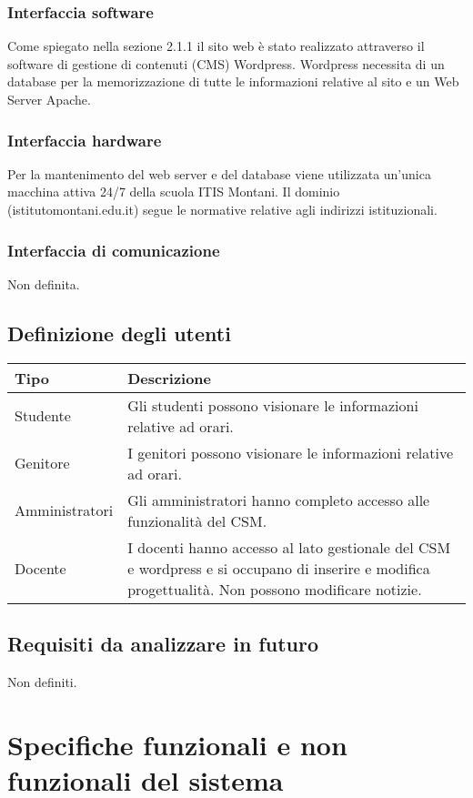 \documentclass{article}
\begin{document}
	\subsubsection{\textbf{Interfaccia software}}
	Come spiegato nella sezione 2.1.1 il sito web è stato realizzato attraverso il software di gestione di contenuti (CMS) Wordpress. Wordpress necessita di un database per la memorizzazione di tutte le informazioni relative al sito e un Web Server Apache.  
	
	\subsubsection{\textbf{Interfaccia hardware}}
	Per la mantenimento del web server e del database viene utilizzata un'unica macchina attiva 24/7 della scuola ITIS Montani. Il dominio (istitutomontani.edu.it) segue le normative relative agli indirizzi istituzionali.
	
	\subsubsection{\textbf{Interfaccia di comunicazione}}
	Non definita.	

	\subsection{\textbf{Definizione degli utenti}}
\begin{tabular}{ |p{3cm}|p{8cm}|  }
	\hline
	\textbf{Tipo}& \textbf{Descrizione}\\
	\hline
	Studente   & Gli studenti possono visionare le informazioni relative ad orari. \\
	\hline
	Genitore   & I genitori possono visionare le informazioni relative ad orari.
	 \\
	\hline
	Amministratori  & Gli amministratori hanno completo accesso alle funzionalità del CSM.\\	
	\hline
	Docente & I docenti hanno accesso al lato gestionale del CSM e wordpress e si occupano di inserire e modifica progettualità. Non possono modificare notizie.
\end{tabular}

	\subsection{\textbf{Requisiti da analizzare in futuro}}
Non definiti.	
\clearpage
	\Large \section{\textbf{Specifiche funzionali e non funzionali del sistema}} 
	\normalsize
	\flushleft
\end{document}

